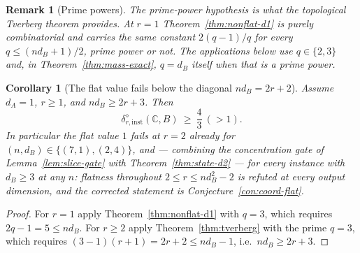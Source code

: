 \documentclass[11pt,a4paper]{article}
\newtheorem{corollary}[theorem]{Corollary}
\newtheorem{remark}[theorem]{Remark}
\begin{document}
\begin{remark}[Prime powers]
\label{rem:prime-powers}
The prime-power hypothesis is what the topological Tverberg theorem provides. At
$r=1$ Theorem~\ref{thm:nonflat-d1} is purely combinatorial and carries the same
constant $2(q-1)/q$ for \emph{every} $q\le(nd_B+1)/2$, prime power or not. The
applications below use $q\in\{2,3\}$ and, in Theorem~\ref{thm:mass-exact}, $q=d_B$
itself when that is a prime power.
\end{remark}

\begin{corollary}[The flat value fails below the diagonal $nd_B=2r+2$]
\label{cor:flat-fails}
Assume $d_A=1$, $r\ge1$, and $nd_B\ge2r+3$. Then
\[
\delta_{r,\mathrm{inst}}^{\diamond}(\mathbb C,B)\ \ge\ \frac43\ (>1).
\]
In particular the flat value $1$ fails at $r=2$ already for $(n,d_B)\in\{(7,1),(2,4)\}$, and --- combining the concentration gate of Lemma~\ref{lem:slice-gate} with Theorem~\ref{thm:state-d2} --- for every instance with $d_B\ge3$ at any $n$: flatness throughout $2\le r\le nd_B^2-2$ is refuted at every output dimension, and the corrected statement is Conjecture~\ref{con:coord-flat}.
\end{corollary}

\begin{proof}
For $r=1$ apply Theorem~\ref{thm:nonflat-d1} with $q=3$, which requires
$2q-1=5\le nd_B$. For $r\ge2$ apply Theorem~\ref{thm:tverberg} with the prime $q=3$,
which requires $(3-1)(r+1)=2r+2\le nd_B-1$, i.e.\ $nd_B\ge2r+3$.
\end{proof}
\end{document}
